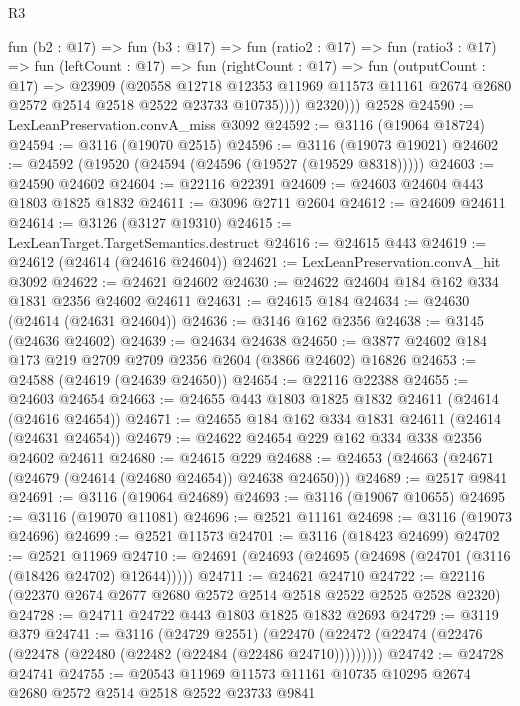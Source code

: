 \begin{lexlean}{R3}
\begin{coremodule}
            fun (b2 : @17) =>
            fun (b3 : @17) =>
            fun (ratio2 : @17) =>
            fun (ratio3 : @17) =>
            fun (leftCount : @17) =>
            fun (rightCount : @17) =>
            fun (outputCount : @17) =>
            @23909
              (@20558
                @12718
                @12353
                @11969
                @11573
                @11161
                @2674
                @2680
                @2572
                @2514
                @2518
                @2522
                @23733
                @10735))))
          @2320)))
    @2528
@24590 := LexLeanPreservation.convA_miss @3092
@24592 := @3116 (@19064 @18724)
@24594 := @3116 (@19070 @2515)
@24596 := @3116 (@19073 @19021)
@24602 := @24592 (@19520 (@24594 (@24596 (@19527 (@19529 @8318)))))
@24603 := @24590 @24602
@24604 := @22116 @22391
@24609 := @24603 @24604 @443 @1803 @1825 @1832
@24611 := @3096 @2711 @2604
@24612 := @24609 @24611
@24614 := @3126 (@3127 @19310)
@24615 := LexLeanTarget.TargetSemantics.destruct
@24616 := @24615 @443
@24619 := @24612 (@24614 (@24616 @24604))
@24621 := LexLeanPreservation.convA_hit @3092
@24622 := @24621 @24602
@24630 := @24622 @24604 @184 @162 @334 @1831 @2356 @24602 @24611
@24631 := @24615 @184
@24634 := @24630 (@24614 (@24631 @24604))
@24636 := @3146 @162 @2356
@24638 := @3145 (@24636 @24602)
@24639 := @24634 @24638
@24650 := @3877 @24602 @184 @173 @219 @2709 @2709 @2356 @2604 (@3866 @24602) @16826
@24653 := @24588 (@24619 (@24639 @24650))
@24654 := @22116 @22388
@24655 := @24603 @24654
@24663 := @24655 @443 @1803 @1825 @1832 @24611 (@24614 (@24616 @24654))
@24671 := @24655 @184 @162 @334 @1831 @24611 (@24614 (@24631 @24654))
@24679 := @24622 @24654 @229 @162 @334 @338 @2356 @24602 @24611
@24680 := @24615 @229
@24688 := @24653 (@24663 (@24671 (@24679 (@24614 (@24680 @24654)) @24638 @24650)))
@24689 := @2517 @9841
@24691 := @3116 (@19064 @24689)
@24693 := @3116 (@19067 @10655)
@24695 := @3116 (@19070 @11081)
@24696 := @2521 @11161
@24698 := @3116 (@19073 @24696)
@24699 := @2521 @11573
@24701 := @3116 (@18423 @24699)
@24702 := @2521 @11969
@24710 := @24691 (@24693 (@24695 (@24698 (@24701 (@3116 (@18426 @24702) @12644)))))
@24711 := @24621 @24710
@24722 := @22116 (@22370 @2674 @2677 @2680 @2572 @2514 @2518 @2522 @2525 @2528 @2320)
@24728 := @24711 @24722 @443 @1803 @1825 @1832 @2693
@24729 := @3119 @379
@24741 := @3116
    (@24729 @2551)
    (@22470 (@22472 (@22474 (@22476 (@22478 (@22480 (@22482 (@22484 (@22486 @24710)))))))))
@24742 := @24728 @24741
@24755 := @20543 @11969 @11573 @11161 @10735 @10295 @2674 @2680 @2572 @2514 @2518 @2522 @23733 @9841

\end{coremodule}
\end{lexlean}
